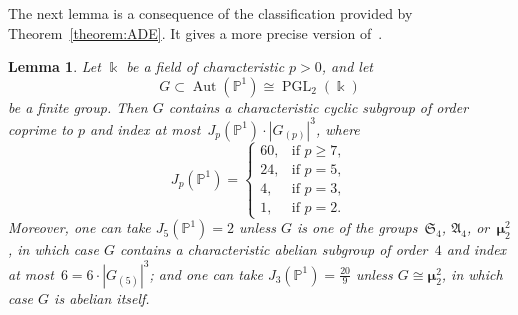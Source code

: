 \documentclass[12pt]{amsart}
\numberwithin{equation}{section}
\newtheorem{lemma}[subsection]{Lemma}
\theoremstyle{definition}
\newcommand{\mumu}{\boldsymbol{\mu}}
\newcommand{\PP}{\mathbb P}
\DeclareMathOperator{\Aut}{Aut}
\DeclareMathOperator{\PGL}{PGL}
\def \ge {\geqslant}
\begin{document}
The next lemma is a consequence of the classification provided
by Theorem~\ref{theorem:ADE}. It gives a more precise version
of~\mbox{\cite[Lemma~8.5]{ChenShramov}}.

\begin{lemma}\label{lemma:P1}
Let $\Bbbk$ be a field of characteristic $p>0$,
and let
$$
G\subset \Aut(\PP^1)\cong \PGL_2(\Bbbk)
$$
be a finite group. Then $G$
contains a characteristic cyclic subgroup
of order coprime
to $p$ and index at most~\mbox{$J_p(\PP^1)\cdot |G_{(p)}|^{3}$},
where
\begin{equation}\label{eq:constant-PGL2}
J_p(\PP^1)=\begin{cases}
60, &\text{if\ } p\ge 7,\\
24, &\text{if\ } p=5,\\
4, &\text{if\ } p=3,\\
1, &\text{if\ } p=2.
\end{cases}
\end{equation}
Moreover, one can take $J_5(\PP^1)=2$ unless
$G$ is one of the groups~$\mathfrak{S}_4$, $\mathfrak{A}_4$, or~$\mumu_2^2$, in which case
$G$ contains a characteristic abelian subgroup of order~$4$ and index at
most~\mbox{$6=6\cdot |G_{(5)}|^3$};
and one can take $J_3(\PP^1)=\frac{20}{9}$ unless
$G\cong\mumu_2^2$, in which case $G$ is abelian itself.
\end{lemma}
\end{document}
